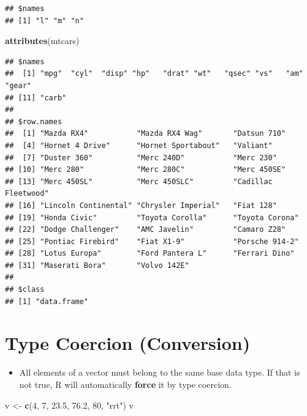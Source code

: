 \documentclass[]{book}
\newenvironment{Shaded}{\begin{snugshade}}{\end{snugshade}}
\newcommand{\DecValTok}[1]{\textcolor[rgb]{0.00,0.00,0.81}{#1}}
\newcommand{\FloatTok}[1]{\textcolor[rgb]{0.00,0.00,0.81}{#1}}
\newcommand{\KeywordTok}[1]{\textcolor[rgb]{0.13,0.29,0.53}{\textbf{#1}}}
\newcommand{\NormalTok}[1]{#1}
\newcommand{\StringTok}[1]{\textcolor[rgb]{0.31,0.60,0.02}{#1}}
\providecommand{\tightlist}{%
  \setlength{\itemsep}{0pt}\setlength{\parskip}{0pt}}
\begin{document}
\begin{verbatim}
## $names
## [1] "l" "m" "n"
\end{verbatim}

\begin{Shaded}
\begin{Highlighting}[]
\KeywordTok{attributes}\NormalTok{(mtcars)}
\end{Highlighting}
\end{Shaded}

\begin{verbatim}
## $names
##  [1] "mpg"  "cyl"  "disp" "hp"   "drat" "wt"   "qsec" "vs"   "am"   "gear"
## [11] "carb"
## 
## $row.names
##  [1] "Mazda RX4"           "Mazda RX4 Wag"       "Datsun 710"         
##  [4] "Hornet 4 Drive"      "Hornet Sportabout"   "Valiant"            
##  [7] "Duster 360"          "Merc 240D"           "Merc 230"           
## [10] "Merc 280"            "Merc 280C"           "Merc 450SE"         
## [13] "Merc 450SL"          "Merc 450SLC"         "Cadillac Fleetwood" 
## [16] "Lincoln Continental" "Chrysler Imperial"   "Fiat 128"           
## [19] "Honda Civic"         "Toyota Corolla"      "Toyota Corona"      
## [22] "Dodge Challenger"    "AMC Javelin"         "Camaro Z28"         
## [25] "Pontiac Firebird"    "Fiat X1-9"           "Porsche 914-2"      
## [28] "Lotus Europa"        "Ford Pantera L"      "Ferrari Dino"       
## [31] "Maserati Bora"       "Volvo 142E"         
## 
## $class
## [1] "data.frame"
\end{verbatim}

\hypertarget{type-coercion-conversion}{%
\section{Type Coercion (Conversion)}\label{type-coercion-conversion}}

\begin{itemize}
\tightlist
\item
  All elements of a vector must belong to the same base data type. If that is not true, R will automatically \textbf{force} it by type coercion.
\end{itemize}

\begin{Shaded}
\begin{Highlighting}[]
\NormalTok{v <-}\StringTok{ }\KeywordTok{c}\NormalTok{(}\DecValTok{4}\NormalTok{, }\DecValTok{7}\NormalTok{, }\FloatTok{23.5}\NormalTok{, }\FloatTok{76.2}\NormalTok{, }\DecValTok{80}\NormalTok{, }\StringTok{"rrt"}\NormalTok{)}
\NormalTok{v}
\end{Highlighting}
\end{Shaded}
\end{document}
